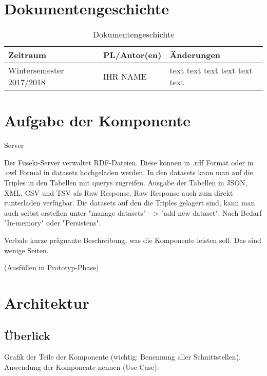 \section{Dokumentengeschichte}
\begin{table}[h]
 \begin{tabular}{|l|l|p{4cm}|}
 \hline
 Zeitraum & PL/Autor(en) & Änderungen \\
 \hline
 Wintersemester 2017/2018 & IHR NAME & 
text \newline 
text \newline 
text \newline 
text \newline 
text \newline 
text \newline 
 
  \\
 \hline
 \end{tabular}
 \caption{Dokumentengeschichte}
 \end{table}

\section{Aufgabe der Komponente}

Server

Der Fuseki-Server verwaltet RDF-Dateien. Diese können in .rdf Format oder in .owl Formal in datasets hochgeladen werden.
In den datasets kann man auf die Triples in den Tabellen mit querys zugreifen. Ausgabe der Tabellen in JSON, XML, CSV und TSV als Raw Response. Raw Response auch zum direkt runterladen verfügbar. Die datasets auf den die Triples gelagert sind, kann man auch selbst erstellen unter "manage datasets" - > "add new dataset". Nach Bedarf "In-memory" oder "Persistens".


Verbale kurze prägnante Beschreibung, was die Komponente leisten soll.
Das sind wenige Seiten.

(Ausfüllen in Prototyp-Phase)

\section{Architektur}

\subsection{Überlick}
Grafik der Teile der Komponente (wichtig: Benennung aller Schnittstellen). 
Anwendung der Komponente nennen (Use Case).

